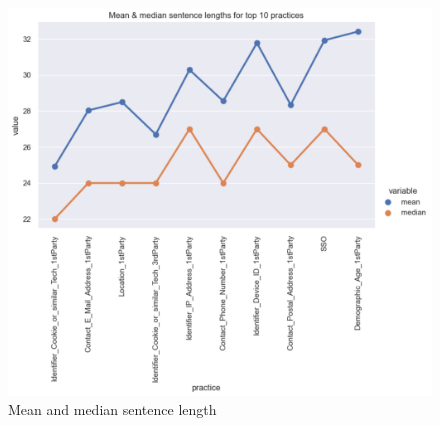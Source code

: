 \begin{figure}[!ht]
	\centering
	\includegraphics[width=1\textwidth]{figures/eda_mean_median.png}      
    \caption{Mean and median sentence length}
    \label{fig:graph_sentence_length}
\end{figure}


